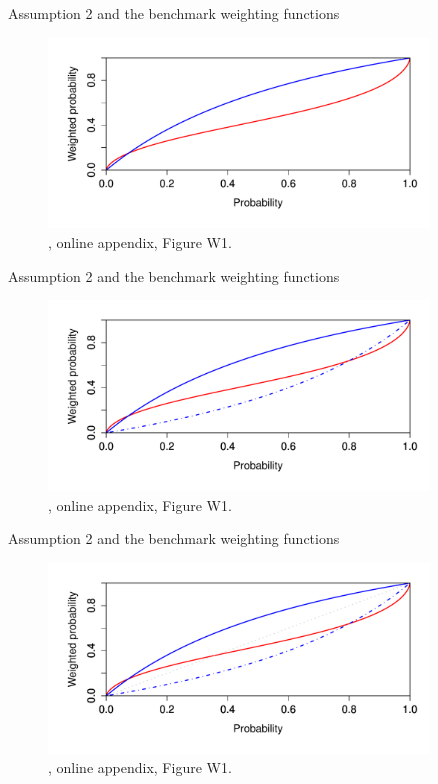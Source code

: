 \begin{frame}{Assumption 2 and the benchmark weighting functions}
    \begin{figure}
        \centering
        \includegraphics[width = 0.9\textwidth]{decomposition_distortions2}
        \caption{\citet{EbertStrack2015}, online appendix, Figure W1.}
    \end{figure}
\end{frame}

\begin{frame}{Assumption 2 and the benchmark weighting functions}
    \begin{figure}
        \centering
        \includegraphics[width = 0.9\textwidth]{decomposition_distortions3}
        \caption{\citet{EbertStrack2015}, online appendix, Figure W1.}
    \end{figure}
\end{frame}

\begin{frame}{Assumption 2 and the benchmark weighting functions}
    \begin{figure}
        \centering
        \includegraphics[width = 0.9\textwidth]{decomposition_distortions4}
        \caption{\citet{EbertStrack2015}, online appendix, Figure W1.}
    \end{figure}
\end{frame}





